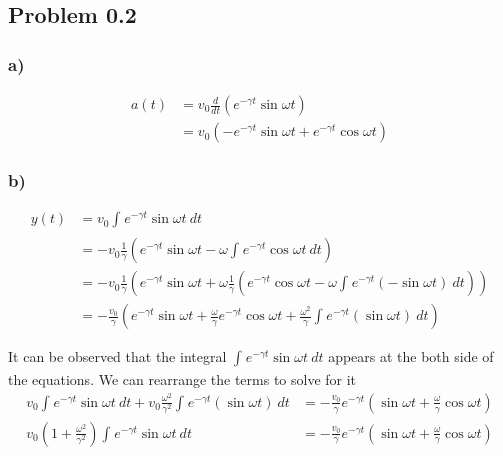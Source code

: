 \documentclass[../homework.tex]{subfiles}
\begin{document}
\subsection{Problem 0.2}
\subsubsection*{a)}
\begin{align*}
    a(t) & = v_0 \frac{d}{dt} \left(e^{-\gamma t} \sin{\omega t}  \right)                   \\
         & = v_0 \left( -e^{-\gamma t}\sin{\omega t} + e^{-\gamma t} \cos{\omega t} \right)
\end{align*}
\subsubsection*{b)}
\begin{align*}
    y(t) & = v_0 \int_{}^{} e^{-\gamma t} \sin{\omega t}~dt                                                                       \\
         & = -v_0 \frac{1}{\gamma} \left(e^{-\gamma t} \sin{\omega t} - \omega \int_{}^{} e^{-\gamma t} \cos{\omega t}~dt \right) \\
         & = -v_0 \frac{1}{\gamma} \left(e^{-\gamma t} \sin{\omega t} + \omega \frac{1}{\gamma} \left(
    e^{-\gamma t} \cos{\omega t} - \omega \int_{}^{} e^{-\gamma t} (-\sin{\omega t})~dt
    \right) \right)                                                                                                               \\
         & = -\frac{v_0}{\gamma} \left(e^{-\gamma t} \sin{\omega t}
    + \frac{\omega}{\gamma} e^{-\gamma t} \cos{\omega t} + \frac{\omega^2}{\gamma} \int_{}^{} e^{-\gamma t} (\sin{\omega t})~dt
    \right)
\end{align*}

It can be observed that the integral $\int_{}^{} e^{-\gamma t} \sin{\omega t}~dt$ appears at the both side of the equations. We can rearrange the terms to solve for it
\begin{align*}
    v_0 \int_{}^{} e^{-\gamma t} \sin{\omega t}~dt + v_0 \frac{\omega^2}{\gamma^2} \int_{}^{} e^{-\gamma t} (\sin{\omega t})~dt & =
    -\frac{v_0}{\gamma} e^{-\gamma t} \left(\sin{\omega t} + \frac{\omega}{\gamma}\cos{\omega t} \right)                            \\
    v_0 \left(1 + \frac{\omega^2}{\gamma^2}\right) \int_{}^{} e^{-\gamma t} \sin{\omega t}~dt                                   & =
    -\frac{v_0}{\gamma} e^{-\gamma t} \left(\sin{\omega t} + \frac{\omega}{\gamma}\cos{\omega t} \right)
\end{align*}
\end{document}
